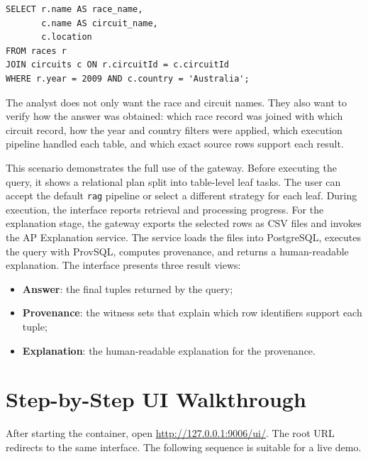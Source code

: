 \documentclass[11pt,a4paper]{article}
\newcommand{\code}[1]{\texttt{#1}}
\begin{document}
\begin{lstlisting}[style=codestyle]
SELECT r.name AS race_name,
       c.name AS circuit_name,
       c.location
FROM races r
JOIN circuits c ON r.circuitId = c.circuitId
WHERE r.year = 2009 AND c.country = 'Australia';
\end{lstlisting}

The analyst does not only want the race and circuit names. They also want to
verify how the answer was obtained: which race record was joined with which
circuit record, how the year and country filters were applied, which execution
pipeline handled each table, and which exact source rows support each result.

This scenario demonstrates the full use of the gateway. Before executing the
query, it shows a relational plan split into table-level leaf tasks. The user
can accept the default \code{rag} pipeline or select a different strategy for
each leaf. During execution, the interface reports retrieval and processing
progress.
For the explanation stage, the gateway exports the selected rows as CSV files
and invokes the AP Explanation service. The service loads the files into
PostgreSQL, executes the query with ProvSQL, computes provenance, and returns a
human-readable explanation. The interface presents three result views:

\begin{itemize}
  \item \textbf{Answer}: the final tuples returned by the query;
  \item \textbf{Provenance}: the witness sets that explain which row identifiers
       support each tuple;
  \item \textbf{Explanation}: the human-readable explanation for the provenance.
\end{itemize}


\section{Step-by-Step UI Walkthrough}

After starting the container, open \url{http://127.0.0.1:9006/ui/}. The root URL
redirects to the same interface. The following sequence is suitable for a live
demo.
\end{document}
